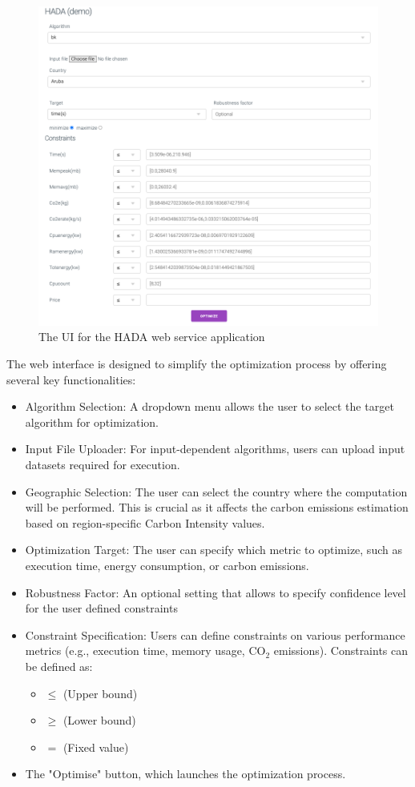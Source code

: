 \documentclass[a4paper,singleside,12pt]{report} %
\begin{document}
\begin{figure}[h!]
    \centering
    \includegraphics[width=\textwidth]{imgs/HADA-main-ui.png}
    \caption{The UI for the HADA web service application}
    \label{fig:hada_ui}
\end{figure}

The web interface is designed to simplify the optimization process by offering several key functionalities:
\begin{itemize}
    \item Algorithm Selection: A dropdown menu allows the user to select the target algorithm for optimization.
    \item Input File Uploader: For input-dependent algorithms, users can upload input datasets required for execution.
    \item Geographic Selection: The user can select the country where the computation will be performed. This is crucial as it affects the carbon emissions estimation based on region-specific Carbon Intensity values.
    \item Optimization Target: The user can specify which metric to optimize, such as execution time, energy consumption, or carbon emissions.
    \item Robustness Factor: An optional setting that allows to specify confidence level for the user defined constraints
    \item Constraint Specification: Users can define constraints on various performance metrics (e.g., execution time, memory usage, CO$_2$ emissions). Constraints can be defined as:
    \begin{itemize}
        \item $\leq$ (Upper bound) 
        \item $\geq$ (Lower bound)
        \item $=$ (Fixed value)
    \end{itemize} 
    \item The "Optimise" button, which launches the optimization process.
\end{itemize}
\end{document}
